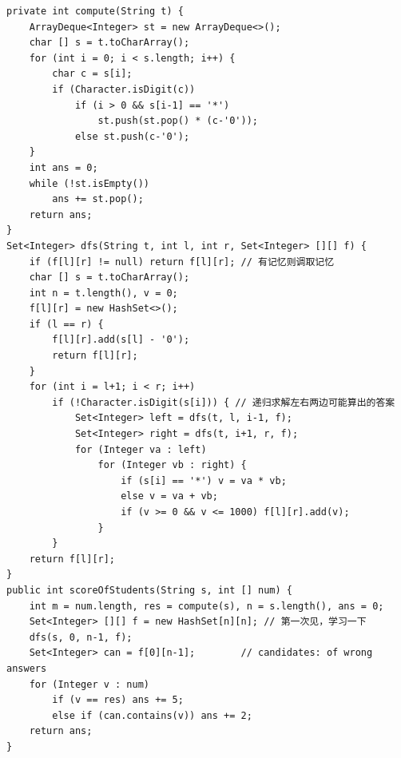 \documentclass[9pt, b5paaper]{book}
\begin{document}
\begin{verbatim}
private int compute(String t) {
    ArrayDeque<Integer> st = new ArrayDeque<>();
    char [] s = t.toCharArray();
    for (int i = 0; i < s.length; i++) {
        char c = s[i];
        if (Character.isDigit(c)) 
            if (i > 0 && s[i-1] == '*') 
                st.push(st.pop() * (c-'0'));
            else st.push(c-'0');
    }
    int ans = 0;
    while (!st.isEmpty()) 
        ans += st.pop();
    return ans;
}
Set<Integer> dfs(String t, int l, int r, Set<Integer> [][] f) {
    if (f[l][r] != null) return f[l][r]; // 有记忆则调取记忆
    char [] s = t.toCharArray();
    int n = t.length(), v = 0;
    f[l][r] = new HashSet<>();
    if (l == r) {
        f[l][r].add(s[l] - '0');
        return f[l][r];
    }
    for (int i = l+1; i < r; i++) 
        if (!Character.isDigit(s[i])) { // 递归求解左右两边可能算出的答案
            Set<Integer> left = dfs(t, l, i-1, f);
            Set<Integer> right = dfs(t, i+1, r, f);
            for (Integer va : left) 
                for (Integer vb : right) {
                    if (s[i] == '*') v = va * vb;
                    else v = va + vb;
                    if (v >= 0 && v <= 1000) f[l][r].add(v);
                }
        }
    return f[l][r];
}
public int scoreOfStudents(String s, int [] num) { 
    int m = num.length, res = compute(s), n = s.length(), ans = 0;
    Set<Integer> [][] f = new HashSet[n][n]; // 第一次见，学习一下
    dfs(s, 0, n-1, f);
    Set<Integer> can = f[0][n-1];        // candidates: of wrong answers
    for (Integer v : num) 
        if (v == res) ans += 5;
        else if (can.contains(v)) ans += 2;
    return ans;
}
\end{verbatim}
\end{document}

